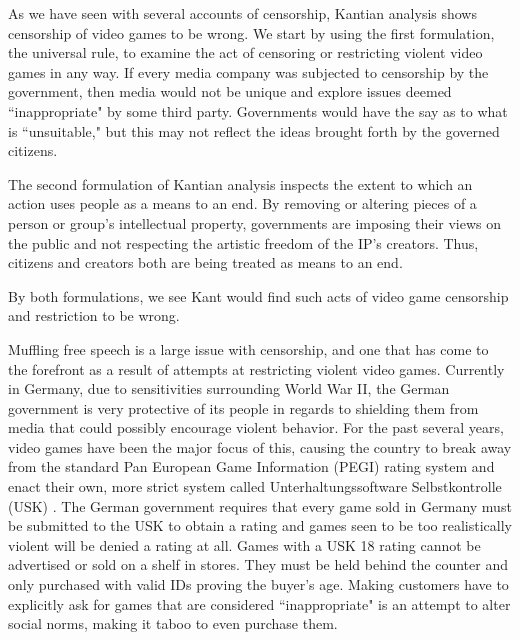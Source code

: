 
\indent \indent As we have seen with several accounts of censorship, Kantian analysis shows censorship of video games to be wrong. We start by using the first formulation, the universal rule, to examine the act of censoring or restricting violent video games in any way. If every media company was subjected to censorship by the government, then media would not be unique and explore issues deemed ``inappropriate" by some third party. Governments would have the say as to what is ``unsuitable," but this may not reflect the ideas brought forth by the governed citizens. 

The second formulation of Kantian analysis inspects the extent to which an action uses people as a means to an end. By removing or altering pieces of a person or group's intellectual property, governments are imposing their views on the public and not respecting the artistic freedom of the IP's creators. Thus, citizens and creators both are being treated as means to an end. 

By both formulations, we see Kant would find such acts of video game censorship and restriction to be wrong. 

Muffling free speech is a large issue with censorship, and one that has come to the forefront as a result of attempts at restricting violent video games. Currently in Germany, due to sensitivities surrounding World War II, the German government is very protective of its people in regards to shielding them from media that could possibly encourage violent behavior. For the past several years, video games have been the major focus of this, causing the country to break away from the standard Pan European Game Information (PEGI) rating system \cite{pegi} and enact their own, more strict system called Unterhaltungssoftware Selbstkontrolle (USK) \cite{usk}. The German government requires that every game sold in Germany must be submitted to the USK to obtain a rating and games seen to be too realistically violent will be denied a rating at all. Games with a USK 18 rating cannot be advertised or sold on a shelf in stores. They must be held behind the counter and only purchased with valid IDs proving the buyer's age. Making customers have to explicitly ask for games that are considered ``inappropriate" is an attempt to alter social norms, making it taboo to even purchase them.

